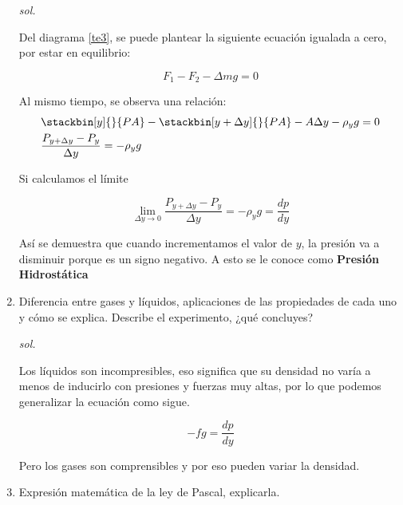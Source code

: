 \begin{enumerate}
    \textit{sol. }
    
    Del diagrama \ref{te3}, se puede plantear la siguiente ecuación igualada a cero, por estar en equilibrio:
    
    \begin{equation*}
        F_1-F_2-\Delta mg=0
    \end{equation*}
    
    Al mismo tiempo, se observa una relación:
\begin{align*}
&\stackbin[y]{}{PA}-\stackbin[y+\Delta y]{}{PA}-A\Delta y-\rho_yg=0\\
&\frac{P_{y+\Delta y}-P_y}{\Delta y}=-\rho_yg
\end{align*}

Si calculamos el límite

\begin{equation*}
    \lim_{\Delta y\to 0}\frac{P_{y+\Delta y}-P_y}{\Delta y}=-\rho_yg=\frac{dp}{dy}
\end{equation*}

Así se demuestra que cuando incrementamos el valor de $y$, la presión va a disminuir porque es un signo negativo. A esto se le conoce como \textbf{Presión Hidrostática }


    \item Diferencia entre gases y líquidos, aplicaciones de las propiedades de cada uno y cómo se explica. Describe el experimento, ¿qué concluyes?
    
    \textit{sol. }
    
    Los líquidos son incompresibles, eso significa que su densidad no varía a menos de inducirlo con presiones y fuerzas muy altas, por lo que podemos generalizar la ecuación como sigue.
    
    \begin{equation}
        -fg=\frac{dp}{dy}
    \end{equation}
    
    Pero los gases son comprensibles y por eso pueden variar la densidad.
    \item  Expresión matemática de la ley de Pascal, explicarla.
    

\end{enumerate}
